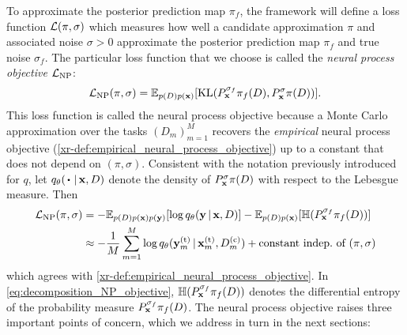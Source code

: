 \documentclass[12pt, twoside]{report}
\newcommand{\xrprefix}[1]{xr-#1}
\begin{document}
To approximate the posterior prediction map $\pi_f$,
the framework will define a loss function $\mathcal{L}(\pi, \sigma)$ which measures how well a candidate approximation $\pi$ and associated noise $\sigma > 0$ approximate the posterior prediction map $\pi_f$ and true noise $\sigma_f$.
The particular loss function that we choose is called the \emph{neural process objective} $\L\ss{NP}$:
\begin{equation}
    \L\ss{NP}(\pi, \sigma)
    = \E_{p(D)p(\vx)}[\KL(P^{\sigma_f}_\vx \pi_f(D), P^{\sigma}_\vx \pi(D))].
\end{equation}
This loss function is called the neural process objective because a Monte Carlo approximation over the tasks $(D_m)_{m=1}^M$
recovers the \emph{empirical} neural process objective (\cref{\xrprefix{def:empirical_neural_process_objective}}) up to a constant that does not depend on $(\pi, \sigma)$.
Consistent with the notation previously introduced for $q$, let $q_\theta(\vardot\cond \vx, D)$ denote the density of $P^\sigma_{\mathbf{x}} \pi(D)$ with respect to the Lebesgue measure.
Then
\begin{align}
    \L\ss{NP}(\pi, \sigma)
    &= -\E_{p(D)p(\vx)p(\vy)}[\log q_{\theta}(\vy \cond \vx, D)]
    - \E_{p(D)p(\vx)}[\Hb(P^{\sigma_f}_\vx \pi_f(D))] \label{eq:decomposition_NP_objective} \\
    &\approx -\frac1M \sum_{m=1}^M \log q_{\theta}(\vy_m\us{(t)} \cond \vx\us{(t)}_m, D\us{(c)}_m)
    + \text{constant indep.\ of $(\pi, \sigma)$}
    \label{eq:neural_process_objective_next_to_KL_objective}
\end{align}
which agrees with \cref{\xrprefix{def:empirical_neural_process_objective}}.
In \eqref{eq:decomposition_NP_objective}, $\mathbb{H}(P^{\sigma_f}_{\mathbf{x}} \pi_f(D))$ denotes the differential entropy of the probability measure $P^{\sigma_f}_{\mathbf{x}} \pi_f(D)$.
The neural process objective raises three important points of concern, which we address in turn in the next sections:
\end{document}
